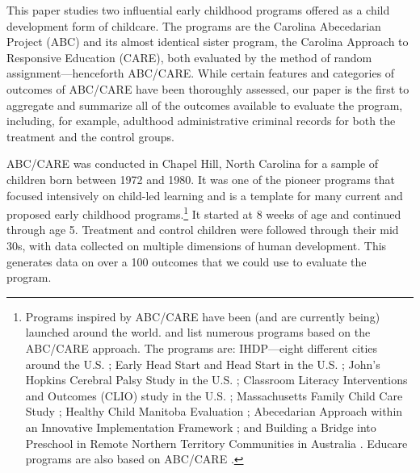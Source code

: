 

This paper studies two influential early childhood programs offered as a child development form of childcare. The programs are the Carolina Abecedarian Project (ABC) and its almost identical sister program, the Carolina Approach to Responsive Education (CARE), both evaluated by the method of random assignment---henceforth ABC/CARE. While certain features and categories of outcomes of ABC/CARE have been thoroughly assessed, our paper is the first to aggregate and summarize all of the outcomes available to evaluate the program, including, for example, adulthood administrative criminal records for both the treatment and the control groups.

ABC/CARE was conducted in Chapel Hill, North Carolina for a sample of children born between 1972 and 1980. It was one of the pioneer programs that focused intensively on child-led learning and is a template for many current and proposed early childhood programs.\footnote{Programs inspired by ABC/CARE have been (and are currently being) launched around the world. \citet{Sparling_2010_Highlights} and \citet{Ramey_Ramey_Lanzi_2014_Interventions} list numerous programs based on the ABC/CARE approach. The programs are: IHDP---eight different cities around the U.S. \citep{Spiker-etal_1997_Helping}; Early Head Start and Head Start in the U.S. \citep{Schneider_McDonald-eds_2007_Scale-Up_Vol-1}; John's Hopkins Cerebral Palsy Study in the U.S. \citep{Sparling_2010_Highlights}; Classroom Literacy Interventions and Outcomes (CLIO) study in the U.S. \citep{Sparling_2010_Highlights}; Massachusetts Family Child Care Study \citep{Collins_etal_2010_Massachusetts-Study}; Healthy Child Manitoba Evaluation \citep{Healthy_Child_Manitoba_2015_Starting-Early}; Abecedarian Approach within an Innovative Implementation Framework \citep{Jensen_Nielsen_2016_ABC-Programme-Pilot}; and Building a Bridge into Preschool in Remote Northern Territory Communities in Australia \citep{UMonash_Dataset_2015_URL}. Educare programs are also based on ABC/CARE \citep{Educare_2014_Research_Agenda,Yazejian_Bryant_2012_Educare}.} It started at 8 weeks of age and continued through age 5. Treatment and control children were followed through their mid 30s, with data collected on multiple dimensions of human development. This generates data on over a 100 outcomes that we could use to evaluate the program.

